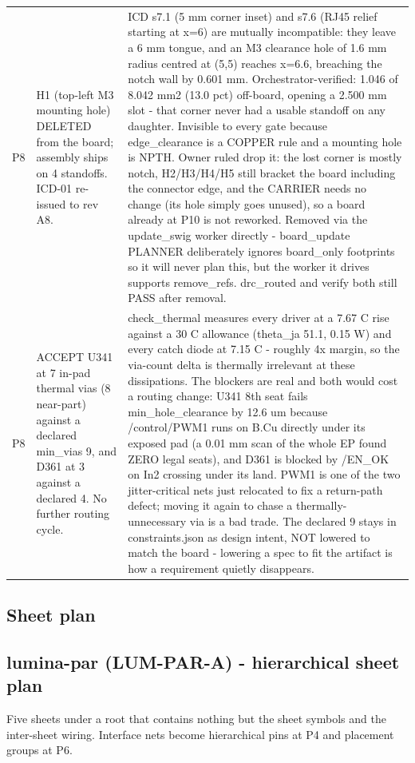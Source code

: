 \documentclass[11pt,a4paper]{article}
\begin{document}
{\begin{longtable}{lp{5.2cm}p{7.2cm}}
P8 & H1 (top-left M3 mounting hole) DELETED from the board; assembly ships on 4 standoffs. ICD-01 re-issued to rev A8. & ICD s7.1 (5 mm corner inset) and s7.6 (RJ45 relief starting at x=6) are mutually incompatible: they leave a 6 mm tongue, and an M3 clearance hole of 1.6 mm radius centred at (5,5) reaches x=6.6, breaching the notch wall by 0.601 mm. Orchestrator-verified: 1.046 of 8.042 mm2 (13.0 pct) off-board, opening a 2.500 mm slot - that corner never had a usable standoff on any daughter. Invisible to every gate because edge\_clearance is a COPPER rule and a mounting hole is NPTH. Owner ruled drop it: the lost corner is mostly notch, H2/H3/H4/H5 still bracket the board including the connector edge, and the CARRIER needs no change (its hole simply goes unused), so a board already at P10 is not reworked. Removed via the update\_swig worker directly - board\_update PLANNER deliberately ignores board\_only footprints so it will never plan this, but the worker it drives supports remove\_refs. drc\_routed and verify both still PASS after removal. \\
P8 & ACCEPT U341 at 7 in-pad thermal vias (8 near-part) against a declared min\_vias 9, and D361 at 3 against a declared 4. No further routing cycle. & check\_thermal measures every driver at a 7.67 C rise against a 30 C allowance (theta\_ja 51.1, 0.15 W) and every catch diode at 7.15 C - roughly 4x margin, so the via-count delta is thermally irrelevant at these dissipations. The blockers are real and both would cost a routing change: U341 8th seat fails min\_hole\_clearance by 12.6 um because /control/PWM1 runs on B.Cu directly under its exposed pad (a 0.01 mm scan of the whole EP found ZERO legal seats), and D361 is blocked by /EN\_OK on In2 crossing under its land. PWM1 is one of the two jitter-critical nets just relocated to fix a return-path defect; moving it again to chase a thermally-unnecessary via is a bad trade. The declared 9 stays in constraints.json as design intent, NOT lowered to match the board - lowering a spec to fit the artifact is how a requirement quietly disappears. \\
\bottomrule
\end{longtable}
}
\subsection*{Sheet plan}
\subsection*{lumina-par (LUM-PAR-A) - hierarchical sheet plan}
Five sheets under a root that contains nothing but the sheet symbols and the inter-sheet wiring. Interface nets become hierarchical pins at P4 and placement groups at P6.
\end{document}
